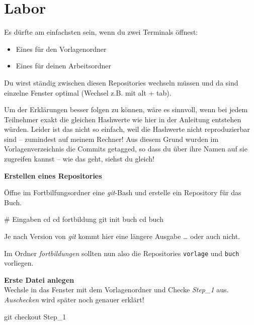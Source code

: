 \documentclass[
  letterpaper,
  DIV=11]{scrreprt}
\newenvironment{Shaded}{\begin{snugshade}}{\end{snugshade}}
\newcommand{\BuiltInTok}[1]{\textcolor[rgb]{0.00,0.23,0.31}{#1}}
\newcommand{\CommentTok}[1]{\textcolor[rgb]{0.37,0.37,0.37}{#1}}
\newcommand{\FunctionTok}[1]{\textcolor[rgb]{0.28,0.35,0.67}{#1}}
\newcommand{\NormalTok}[1]{\textcolor[rgb]{0.00,0.23,0.31}{#1}}
\providecommand{\tightlist}{%
  \setlength{\itemsep}{0pt}\setlength{\parskip}{0pt}}\usepackage{longtable,booktabs,array}
\newcommand{\git}{\textit{git}\xspace}
\newcommand{\alt}[1]{alt + #1\xspace}
\begin{document}
\section{Labor}\label{labor}

Es dürfte am einfachsten sein, wenn du zwei Terminals öffnest:

\begin{itemize}
\tightlist
\item
  Eines für den Vorlagenordner
\item
  Eines für deinen Arbeitsordner
\end{itemize}

Du wirst ständig zwischen diesen Repositories wechseln müssen und da
sind einzelne Fenster optimal (Wechsel z.B. mit \alt{tab}).

\samplestart

Um der Erklärungen besser folgen zu können, wäre es sinnvoll, wenn bei
jedem Teilnehmer exakt die gleichen Hashwerte wie hier in der Anleitung
entstehen würden. Leider ist das nicht so einfach, weil die Hashwerte
nicht reproduzierbar sind -- zumindest auf meinem Rechner! Aus diesem
Grund wurden im Vorlagenverzeichnis die Commits getagged, so dass du
über ihre Namen auf sie zugreifen kannst -- wie das geht, siehst du
gleich! \sampleend

\textbf{Erstellen eines Repositories}

Öffne im Fortbilfungsordner eine \git-Bash und erstelle ein Repository
für das Buch.

\begin{Shaded}
\begin{Highlighting}[]
\CommentTok{\# Eingaben}
\BuiltInTok{cd} 
\BuiltInTok{cd}\NormalTok{ fortbildung}
\FunctionTok{git}\NormalTok{ init buch }
\BuiltInTok{cd}\NormalTok{ buch }
\end{Highlighting}
\end{Shaded}

Je nach Version von \git kommt hier eine längere Ausgabe \ldots{} oder
auch nicht.

Im Ordner \emph{fortbildungen} sollten nun also die Repositories
\texttt{vorlage} und \texttt{buch} vorliegen.

\textbf{Erste Datei anlegen}\\
Wechsle in das Fenster mit dem Vorlagenordner und Checke \emph{Step\_1}
aus. \emph{Auschecken} wird später noch genauer erklärt!

\begin{Shaded}
\begin{Highlighting}[]
\FunctionTok{git}\NormalTok{ checkout Step\_1}
\end{Highlighting}
\end{Shaded}
\end{document}

